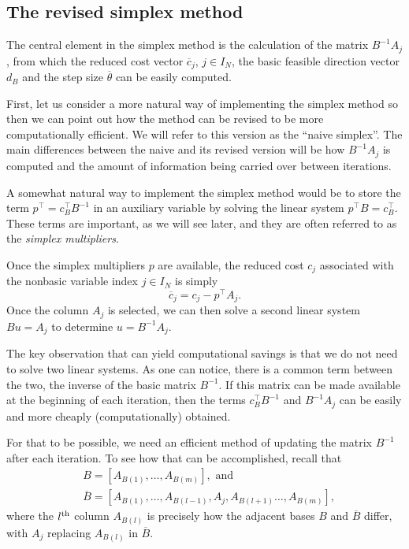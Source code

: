 \subsection{The revised simplex method}

The central element in the simplex method is the calculation of the matrix $B^{-1}A_j$, from which the reduced cost vector $\overline{c}_j$, $j \in I_N$, the basic feasible direction vector $d_B$ and the step size $\overline{\theta}$ can be easily computed.

First, let us consider a more natural way of implementing the simplex method so then we can point out how the method can be revised to be more computationally efficient. We will refer to this version as the ``naive simplex''. The main differences between the naive and its revised version will be how $B^{-1}A_j$ is computed and the amount of information being carried over between iterations.

A somewhat natural way to implement the simplex method would be to store the term $p^\top = c_B^\top B^{-1}$ in an auxiliary variable by solving the linear system $p^\top B = c_B^\top$. These terms are important, as we will see later, and they are often referred to as the \emph{simplex multipliers}.

Once the simplex multipliers $p$ are available, the reduced cost $c_j$ associated with the nonbasic variable index $j \in I_N$ is simply 
%
\begin{equation*}
	\overline{c}_j = c_j - p^\top A_j.	
\end{equation*}
%
Once the column $A_j$ is selected, we can then solve a second linear system $Bu = A_j$ to determine $u = B^{-1}A_j$. 

The key observation that can yield computational savings is that we do not need to solve two linear systems. As one can notice, there is a common term between the two, the inverse of the basic matrix $B^{-1}$. If this matrix can be made available at the beginning of each iteration, then the terms $c_B^\top B^{-1}$ and $B^{-1}A_j$ can be easily and more cheaply (computationally) obtained.

For that to be possible, we need an efficient method of updating the matrix $B^{-1}$ after each iteration. To see how that can be accomplished, recall that
%
\begin{align*}
	& B = [A_{B(1)}, \dots, A_{B(m)}], \text{ and } \\ 
	& \overline{B} = [A_{B(1)}, \dots, A_{B(l-1)},A_j,A_{B(l+1)}\dots, A_{B(m)}], 
\end{align*}
%
where the $l^\text{th}$ column $A_{B(l)}$ is precisely how the adjacent bases $B$ and $\overline{B}$ differ, with $A_j$ replacing $A_{B(l)}$ in $\overline{B}$.


